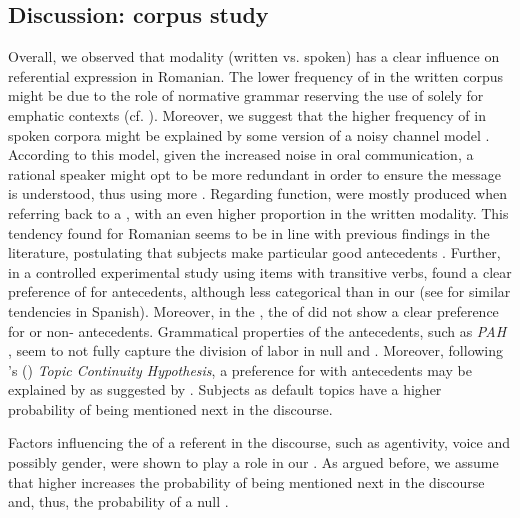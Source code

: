 \documentclass[output=paper,colorlinks,citecolor=brown]{langscibook}
\begin{document}
\subsection{Discussion: corpus study}
Overall, we observed that modality (written vs. spoken) has a clear influence on referential expression  in Romanian. The lower frequency of  in the written corpus might be due to the role of normative grammar reserving the use of  solely for emphatic contexts (cf. \citealt{avram2001gramatica}). Moreover, we suggest that the higher frequency of  in spoken corpora might be explained by some version of a noisy channel model \citep{gibson2013noisy}. According to this model, given the increased noise in oral communication, a rational speaker might opt to be more redundant in order to ensure the message is understood, thus using more . Regarding  function,  were mostly produced when referring  back to a  , with an even higher proportion in the written modality. This tendency found for Romanian seems to be in line with previous findings in the literature, postulating that subjects make particular good antecedents \citep{crawley1990use, arnold1998reference}. Further, in a controlled experimental study using items with transitive verbs, \citet{istrate2022position} found a clear preference of  for  antecedents, although less categorical than in our  (see \citealt{de2013effects} for similar tendencies in Spanish). Moreover, in the , the  of  did not show a clear preference for  or non- antecedents. Grammatical properties of the antecedents, such as \textit {PAH} \citep{carminati2002processing}, seem to not fully capture the division of labor in null and . Moreover, following \citeauthor{givon1983topic}'s (\citeyear{givon1983topic}) \textit{Topic Continuity Hypothesis}, a preference for  with  antecedents may be explained by  as suggested by \citet{mayol2010refining}. Subjects as default topics have a higher probability of being mentioned next in the discourse. 

Factors influencing the  of a referent in the discourse, such as agentivity, voice and possibly gender, were shown to play a role in our . As argued before, we assume that higher  increases the probability of being mentioned next in the discourse and, thus, the probability of a null .
\end{document}
